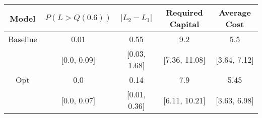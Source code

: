 \begin{tabular}{ccccc}
\toprule
   Model & $P(L > Q(0.6))$ & $|L_2 - L_1|$ & Required Capital & Average Cost \\
\midrule
Baseline &            0.01 &          0.55 &              9.2 &          5.5 \\
         &     [0.0, 0.09] &  [0.03, 1.68] &    [7.36, 11.08] & [3.64, 7.12] \\
     Opt &             0.0 &          0.14 &              7.9 &         5.45 \\
         &     [0.0, 0.07] &  [0.01, 0.36] &    [6.11, 10.21] & [3.63, 6.98] \\
\bottomrule
\end{tabular}
